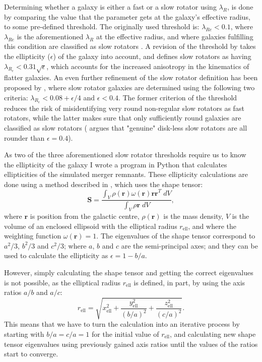 \documentclass[english, oneside]{HYgradu}
\begin{document}
Determining whether a galaxy is either a fast or a slow rotator using $\lambda_R$, is done by comparing the value that the parameter gets at the galaxy's effective radius, to some pre-defined threshold. The originally used threshold is: $\lambda_{Re} < 0.1$, where $\lambda_{Re}$ is the aforementioned $\lambda_R$ at the effective radius, and where galaxies fulfilling this condition are classified as slow rotators \citep{Emsellem2007}. A revision of the threshold by \cite{Emsellem2011} takes the ellipticity ($\epsilon$) of the galaxy into account, and defines slow rotators as having $\lambda_{R_e} < 0.31 \sqrt{\epsilon}$, which accounts for the increased anisotropy in the kinematics of flatter galaxies. An even further refinement of the slow rotator definition has been proposed by \cite{Cappellari2016}, where slow rotator galaxies are determined using the following two criteria: $\lambda_{R_e} < 0.08 + \epsilon/4$ and $\epsilon < 0.4$. The former criterion of the threshold reduces the risk of misidentifying very round non-regular slow rotators as fast rotators, while the latter makes sure that only sufficiently round galaxies are classified as slow rotators (\citealt{Cappellari2016} argues that "genuine" disk-less slow rotators are all rounder than $\epsilon = 0.4$).

As two of the three aforementioned slow rotator thresholds require us to know the ellipticity of the galaxy I wrote a program in Python that calculates ellipticities of the simulated merger remnants. These ellipticity calculations are done using a method described in \cite{Zemp2011}, which uses the shape tensor:
\begin{equation}
\mathbf{S} = \frac{\int_V \rho(\mathbf{r}) \omega(\mathbf{r}) \mathbf{r} \mathbf{r}^T \; dV }{\int_V \rho{\mathbf{r}} \; dV},
\end{equation}
where $\mathbf{r}$ is position from the galactic centre, $\rho(\mathbf{r})$ is the mass density, $V$ is the volume of an enclosed ellipsoid with the elliptical radius $r_\mathrm{ell}$, and where the weighting function $\omega(\mathbf{r}) = 1$. The eigenvalues of the shape tensor correspond to $a^2/3$, $b^2/3$ and $c^2/3$; where $a$, $b$ and $c$ are the semi-principal axes; and they can be used to calculate the ellipticity as $\epsilon = 1 - b/a$. 

However, simply calculating the shape tensor and getting the correct eigenvalues is not possible, as the elliptical radius $r_\mathrm{ell}$ is defined, in part, by using the axis ratios $a/b$ and $a/c$:
\begin{equation}
r_\mathrm{ell} = \sqrt{x_\mathrm{ell}^2 + \frac{y_\mathrm{ell}^2}{(b/a)^2} + \frac{z_\mathrm{ell}^2}{(c/a)^2}}.
\end{equation}
This means that we have to turn the calculation into an iterative process by starting with $b/a = c/a = 1$ for the initial value of $r_\mathrm{ell}$, and calculating new shape tensor eigenvalues using previously gained axis ratios until the values of the ratios start to converge. 
\end{document}
